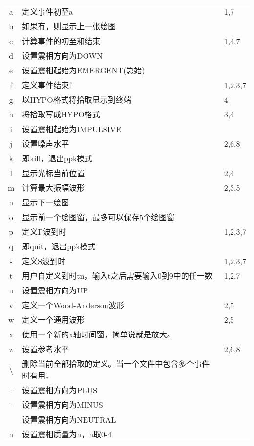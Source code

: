 \begin{center}
\begin{longtable}{cll}
a	    &	定义事件初至a                           &   1,7	    \\
b	    &	如果有，则显示上一张绘图	            &           \\
c	    &	计算事件的初至和结束                    &   1,4,7	\\
d	    &	设置震相方向为DOWN	                    &           \\
e     	&	设置震相起始为EMERGENT(急始)	        &           \\
f	    &	定义事件结束f                           &  1,2,3,7	\\
g	    &	以HYPO格式将拾取显示到终端              &   4   	\\
h   	&	将拾取写成HYPO格式                      &   3,4 	\\
i	    &	设置震相起始为IMPULSIVE	                &           \\
j	    &	设置噪声水平                            &   2,6,8	\\
k       &   即kill，退出ppk模式                     &           \\
l	    &	显示光标当前位置                        &   2,4	    \\
m	    &	计算最大振幅波形                        &   2,3,5	\\
n	    &	显示下一绘图	                        &           \\
o	    &	显示前一个绘图窗，最多可以保存5个绘图窗	&           \\
p	    &	定义P波到时                             &   1,2,3,7	\\
q	    &	即quit，退出ppk模式	                            &           \\
s	    &	定义S波到时                             &   1,2,3,7 \\
t	    &	用户自定义到时tn，输入t之后需要输入0到9中的任一数	&   1,2,7\\
u	    &	设置震相方向为UP	                    &           \\
v	    &	定义一个Wood-Anderson波形               &   2,5 	\\
w	    &	定义一个通用波形                        &   2,5 	\\
x	    &	使用一个新的x轴时间窗，简单说就是放大。 &           \\
z	    &	设置参考水平                            &   2,6,8	\\
\textbackslash	    &	删除当前全部拾取的定义。当一个文件中包含多个事件时有用。&	\\
+	    &	设置震相方向为PLUS	                    &           \\
-	    &	设置震相方向为MINUS	                    &           \\
\lstinline[showspaces]! !   &	设置震相方向为NEUTRAL	                &           \\
n	    &	设置震相质量为n，n取0-4	                &           \\
\end{longtable}
\end{center}

